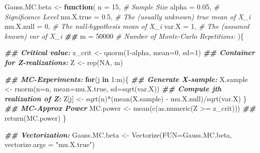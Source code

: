 \documentclass[
]{book}
\newenvironment{Shaded}{\begin{snugshade}}{\end{snugshade}}
\newcommand{\AttributeTok}[1]{\textcolor[rgb]{0.77,0.63,0.00}{#1}}
\newcommand{\CommentTok}[1]{\textcolor[rgb]{0.56,0.35,0.01}{\textit{#1}}}
\newcommand{\ConstantTok}[1]{\textcolor[rgb]{0.00,0.00,0.00}{#1}}
\newcommand{\ControlFlowTok}[1]{\textcolor[rgb]{0.13,0.29,0.53}{\textbf{#1}}}
\newcommand{\DecValTok}[1]{\textcolor[rgb]{0.00,0.00,0.81}{#1}}
\newcommand{\DocumentationTok}[1]{\textcolor[rgb]{0.56,0.35,0.01}{\textbf{\textit{#1}}}}
\newcommand{\FloatTok}[1]{\textcolor[rgb]{0.00,0.00,0.81}{#1}}
\newcommand{\FunctionTok}[1]{\textcolor[rgb]{0.00,0.00,0.00}{#1}}
\newcommand{\NormalTok}[1]{#1}
\newcommand{\OtherTok}[1]{\textcolor[rgb]{0.56,0.35,0.01}{#1}}
\newcommand{\SpecialCharTok}[1]{\textcolor[rgb]{0.00,0.00,0.00}{#1}}
\newcommand{\StringTok}[1]{\textcolor[rgb]{0.31,0.60,0.02}{#1}}
\begin{document}
\begin{Shaded}
\begin{Highlighting}[]
\NormalTok{Gauss.MC.beta }\OtherTok{\textless{}{-}} \ControlFlowTok{function}\NormalTok{(}
    \AttributeTok{n         =} \DecValTok{15}\NormalTok{,    }\CommentTok{\# Sample Size}
    \AttributeTok{alpha     =}  \FloatTok{0.05}\NormalTok{, }\CommentTok{\# Significance Level}
    \AttributeTok{mu.X.true =}  \FloatTok{0.5}\NormalTok{,  }\CommentTok{\# The (usually unknown) true mean of X\_i}
    \AttributeTok{mu.X.null =}  \DecValTok{0}\NormalTok{,    }\CommentTok{\# The null{-}hypothesis mean of X\_i}
    \AttributeTok{var.X     =}  \DecValTok{1}\NormalTok{,    }\CommentTok{\# The (assumed known)  var of X\_i}
    \DocumentationTok{\#\#}
    \AttributeTok{m         =} \DecValTok{50000}  \CommentTok{\# Number of Monte{-}Carlo Repetitions:}
\NormalTok{    )\{}

  \DocumentationTok{\#\# Critical value:}
\NormalTok{  z\_crit }\OtherTok{\textless{}{-}} \FunctionTok{qnorm}\NormalTok{(}\DecValTok{1}\SpecialCharTok{{-}}\NormalTok{alpha, }\AttributeTok{mean=}\DecValTok{0}\NormalTok{, }\AttributeTok{sd=}\DecValTok{1}\NormalTok{)}
  \DocumentationTok{\#\# Container for Z{-}realizations:}
\NormalTok{  Z         }\OtherTok{\textless{}{-}} \FunctionTok{rep}\NormalTok{(}\ConstantTok{NA}\NormalTok{, m)}

  \DocumentationTok{\#\# MC{-}Experiments:}
  \ControlFlowTok{for}\NormalTok{(j }\ControlFlowTok{in} \DecValTok{1}\SpecialCharTok{:}\NormalTok{m)\{}
    \DocumentationTok{\#\# Generate X{-}sample:}
\NormalTok{    X.sample }\OtherTok{\textless{}{-}} \FunctionTok{rnorm}\NormalTok{(}\AttributeTok{n=}\NormalTok{n, }\AttributeTok{mean=}\NormalTok{mu.X.true, }\AttributeTok{sd=}\FunctionTok{sqrt}\NormalTok{(var.X))}
    \DocumentationTok{\#\# Compute jth realization of Z:}
\NormalTok{    Z[j]     }\OtherTok{\textless{}{-}} \FunctionTok{sqrt}\NormalTok{(n)}\SpecialCharTok{*}\NormalTok{(}\FunctionTok{mean}\NormalTok{(X.sample) }\SpecialCharTok{{-}}\NormalTok{ mu.X.null)}\SpecialCharTok{/}\FunctionTok{sqrt}\NormalTok{(var.X)}
\NormalTok{  \}}
  \DocumentationTok{\#\# MC{-}Approx Power}
\NormalTok{  MC.power }\OtherTok{\textless{}{-}} \FunctionTok{mean}\NormalTok{(}\FunctionTok{c}\NormalTok{(}\FunctionTok{as.numeric}\NormalTok{(Z }\SpecialCharTok{\textgreater{}=}\NormalTok{ z\_crit)))}
  \DocumentationTok{\#\#}
  \FunctionTok{return}\NormalTok{(MC.power)}
\NormalTok{\}}

\DocumentationTok{\#\# Vectorization:}
\NormalTok{Gauss.MC.beta }\OtherTok{\textless{}{-}} \FunctionTok{Vectorize}\NormalTok{(}\AttributeTok{FUN=}\NormalTok{Gauss.MC.beta, }\AttributeTok{vectorize.args =} \StringTok{"mu.X.true"}\NormalTok{)}
\end{Highlighting}
\end{Shaded}
\end{document}
